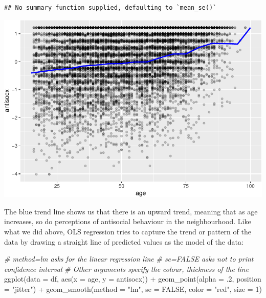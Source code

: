 \documentclass[
]{book}
\newenvironment{Shaded}{\begin{snugshade}}{\end{snugshade}}
\newcommand{\AttributeTok}[1]{\textcolor[rgb]{0.77,0.63,0.00}{#1}}
\newcommand{\CommentTok}[1]{\textcolor[rgb]{0.56,0.35,0.01}{\textit{#1}}}
\newcommand{\ConstantTok}[1]{\textcolor[rgb]{0.00,0.00,0.00}{#1}}
\newcommand{\DecValTok}[1]{\textcolor[rgb]{0.00,0.00,0.81}{#1}}
\newcommand{\FunctionTok}[1]{\textcolor[rgb]{0.00,0.00,0.00}{#1}}
\newcommand{\NormalTok}[1]{#1}
\newcommand{\SpecialCharTok}[1]{\textcolor[rgb]{0.00,0.00,0.00}{#1}}
\newcommand{\StringTok}[1]{\textcolor[rgb]{0.31,0.60,0.02}{#1}}
\begin{document}
\begin{verbatim}
## No summary function supplied, defaulting to `mean_se()`
\end{verbatim}

\includegraphics{09-regression_files/figure-latex/unnamed-chunk-8-1.pdf}

The blue trend line shows us that there is an upward trend, meaning that as age increases, so do perceptions of antisocial behaviour in the neighbourhood. Like what we did above, OLS regression tries to capture the trend or pattern of the data by drawing a straight line of predicted values as the model of the data:

\begin{Shaded}
\begin{Highlighting}[]
\CommentTok{\# method=lm asks for the linear regression line }
\CommentTok{\# se=FALSE asks not to print confidence interval }
\CommentTok{\# Other arguments specify the colour, thickness of the line }
\FunctionTok{ggplot}\NormalTok{(}\AttributeTok{data =}\NormalTok{ df, }\FunctionTok{aes}\NormalTok{(}\AttributeTok{x =}\NormalTok{ age, }\AttributeTok{y =}\NormalTok{ antisocx)) }\SpecialCharTok{+} 
  \FunctionTok{geom\_point}\NormalTok{(}\AttributeTok{alpha =}\NormalTok{ .}\DecValTok{2}\NormalTok{, }\AttributeTok{position =} \StringTok{"jitter"}\NormalTok{) }\SpecialCharTok{+} 
  \FunctionTok{geom\_smooth}\NormalTok{(}\AttributeTok{method =} \StringTok{"lm"}\NormalTok{, }\AttributeTok{se =} \ConstantTok{FALSE}\NormalTok{, }\AttributeTok{color =} \StringTok{"red"}\NormalTok{, }\AttributeTok{size =} \DecValTok{1}\NormalTok{)}
\end{Highlighting}
\end{Shaded}
\end{document}
